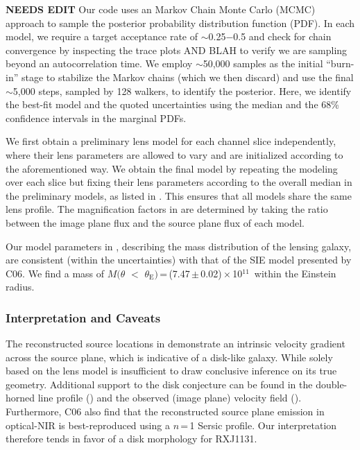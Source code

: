\documentclass[]{emulateapj}
\begin{document}
{\bf NEEDS EDIT}
Our code uses an Markov Chain Monte Carlo (MCMC) approach to sample the
posterior probability distribution function (PDF).
In each model, we require a target acceptance rate of $\sim$0.25$-$0.5
and check for chain convergence by inspecting the trace plots
AND BLAH to verify we are sampling beyond an autocorrelation time.
We employ $\sim$50,000 samples as the initial ``burn-in'' stage
to stabilize the Markov chains (which we then discard) and
use the final $\sim$5,000 steps, sampled by 128 walkers, to identify
the posterior. Here, we
identify the best-fit model and the quoted uncertainties using the
median and the 68\% confidence intervals in the marginal PDFs.


We first obtain a preliminary lens model for each channel slice independently,
where their lens parameters are allowed to vary and are initialized according
to the aforementioned way. We obtain the final model
by repeating the modeling over each slice but fixing their lens parameters
according to the overall median in the preliminary models,
as listed in .
This ensures that all models share the same lens profile.
The magnification factors in  are determined by taking the ratio
between the image plane flux and the source plane flux of each model.

Our model parameters in , describing
the mass distribution of the lensing galaxy, are consistent (within the uncertainties)
with that of the SIE model presented by C06. We find a mass of
$M(\theta$\,\,$<$\,\,$\theta_\textrm{E})$\,=\,(7.47\,$\pm$\,0.02)\,$\times$\,10$^{11}$\,\Msun
within the Einstein radius.

\subsubsection{Interpretation and Caveats} \label{sec:caveat} %
The reconstructed source locations in  demonstrate
an intrinsic velocity gradient across the source plane, which is
indicative of a disk-like galaxy. While solely based on the
lens model is insufficient to draw conclusive inference on its
true geometry. Additional support to the disk conjecture %
can be found in the double-horned line profile ()
and the observed (image plane) velocity field (). Furthermore,
C06 also find that the reconstructed source plane emission in optical-NIR
is best-reproduced using a $n$\,=\,1 Sersic profile.
Our interpretation therefore tends in favor of a disk morphology for RXJ1131.
\end{document}
